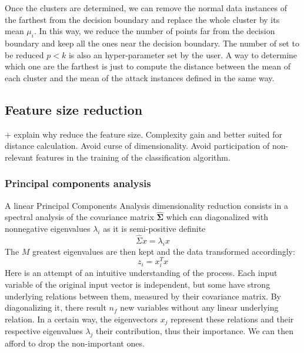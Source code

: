 Once the clusters are determined, we can remove the normal data instances of the farthest from the decision boundary and replace the whole cluster by its mean $\mu_i$. In this way, we reduce the number of points far from the decision boundary and keep all the ones near the decision boundary. The number of set to be reduced $p<k$ is also an hyper-parameter set by the user. A way to determine which one are the farthest is just to compute the distance between the mean of each cluster and the mean of the attack instances defined in the same way.

\subsection{Feature size reduction}
+ explain why reduce the feature size. Complexity gain and better suited for distance calculation. Avoid curse of dimensionality. Avoid participation of non-relevant features in the training of the classification algorithm.

\subsubsection{Principal components analysis}
A linear Principal Components Analysis dimensionality reduction consists in a spectral analysis of the covariance matrix $\mathbf{\hat{\Sigma}}$  which can diagonalized with nonnegative eigenvalues $\lambda_i$ as it is semi-positive definite
\begin{equation}
\hat{\Sigma}x = \lambda_ix
\end{equation}
The $M$ greatest eigenvalues are then kept and the data transformed accordingly:
\begin{equation}
z_i = x_i^Tx
\end{equation}
Here is an attempt of an intuitive understanding of the process. Each input variable of the original input vector is independent, but some have strong underlying relations between them, measured by their covariance matrix. By diagonalizing it, there result $n_f$ new variables without any linear underlying relation. In a certain way, the eigenvectors $x_j$ represent these relations and their respective eigenvalues $\lambda_j$ their contribution, thus their importance. We can then afford to drop the non-important ones.

